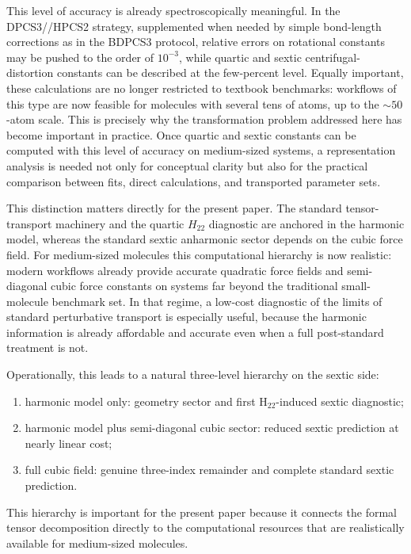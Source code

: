 \documentclass[journal=jacsat,manuscript=article]{achemso}
\begin{document}
This level of accuracy is already spectroscopically meaningful. In the
DPCS3//HPCS2 strategy, supplemented when needed by simple bond-length
corrections as in the BDPCS3 protocol, relative errors on rotational
constants may be pushed to the order of $10^{-3}$, while quartic and sextic
centrifugal-distortion constants can be described at the few-percent level.
\cite{acr_2026,Boussessi_quartic,Boussessi_sextic,hormones_2024,fast_dvib_2025}
Equally important, these calculations are no longer restricted to textbook
benchmarks: workflows of this type are now feasible for molecules with several
tens of atoms, up to the $\sim 50$-atom scale.\cite{hormones_2024,fast_dvib_2025}
This is precisely why the transformation problem addressed here has become
important in practice. Once quartic and sextic constants can be computed with
this level of accuracy on medium-sized systems, a representation analysis is
needed not only for conceptual clarity but also for the practical comparison
between fits, direct calculations, and transported parameter sets.

This distinction matters directly for the present paper. The standard
tensor-transport machinery and the quartic $H_{22}$ diagnostic are anchored in
the harmonic model, whereas the standard sextic anharmonic sector depends on
the cubic force field. For medium-sized molecules this computational hierarchy
is now realistic: modern workflows already provide accurate quadratic force
fields and semi-diagonal cubic force constants on systems far beyond the
traditional small-molecule benchmark set.\cite{cubic-vib_2024,cubic-internal_2024,fast_dvib_2025,hormones_2024,RotBio_2023,AnnRevPC_2023}
In that regime, a low-cost
diagnostic of the limits of standard perturbative transport is especially
useful, because the harmonic information is already affordable and accurate
even when a full post-standard treatment is not.

Operationally, this leads to a natural three-level hierarchy on the sextic
side:
\begin{enumerate}
\item harmonic model only: geometry sector and first H$_{22}$-induced sextic
diagnostic;
\item harmonic model plus semi-diagonal cubic sector: reduced sextic
prediction at nearly linear cost;
\item full cubic field: genuine three-index remainder and complete standard
sextic prediction.
\end{enumerate}
This hierarchy is important for the present paper because it connects the
formal tensor decomposition directly to the computational resources that are
realistically available for medium-sized molecules.
\end{document}
